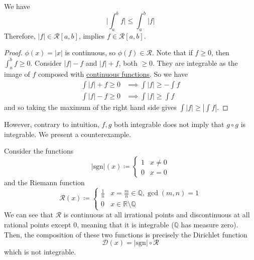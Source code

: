   \begin{theorem}
    \label{thm:triangle-int}
    We have
    \begin{equation}
      \bigg| \int_a^b f \bigg| \leq \int_a^b |f| 
    \end{equation}
    Therefore, $|f| \in \mathcal{R}[a, b]$, implies $f \in \mathcal{R}[a, b]$. 
  \end{theorem}
  \begin{proof}
    $\phi(x) = |x|$ is continuous, so $\phi(f) \in \mathcal{R}$. Note that if $f \geq 0$, then $\int_a^b f \geq 0$. Consider $|f| - f$ and $|f| + f$, both $\geq 0$. They are integrable as the image of $f$ composed with \hyperref[pst-def:continuous_func]{continuous functions}. So we have 
    \begin{align}
      \int |f| + f \geq 0 & \implies \int |f| \geq - \int f \\ 
      \int |f| - f \geq 0 & \implies \int |f| \geq \int f
    \end{align}
    and so taking the maximum of the right hand side gives $\int |f| \geq | \int f|$. 
  \end{proof}

  However, contrary to intuition, $f, g$ both integrable does not imply that $g \circ g$ is integrable. We present a counterexample. 

  \begin{example}
    \label{ex:composition-of-integrable-functions-may-not-be}
    Consider the functions
    \begin{equation}
      |\mathrm{sgn}|(x) \coloneqq \begin{cases}
        1 & x \neq 0 \\
        0 & x = 0
      \end{cases}
    \end{equation}
    and the Riemann function 
    \begin{equation}
      \mathcal{R}(x) \coloneqq \begin{cases}
        \frac{1}{n} & x = \frac{m}{n} \in \mathbb{Q}, \gcd(m, n) = 1 \\
        0 & x \in \mathbb{R} \setminus \mathbb{Q}
      \end{cases}
    \end{equation}
    We can see that $\mathcal{R}$ is continuous at all irrational points and discontinuous at all rational points except $0$, meaning that it is integrable ($\mathbb{Q}$ has measure zero). Then, the composition of these two functions is precisely the Dirichlet function
    \begin{equation}
      \mathcal{D}(x) = |\mathrm{sgn}| \circ \mathcal{R}
    \end{equation}
    which is not integrable. 
  \end{example}

